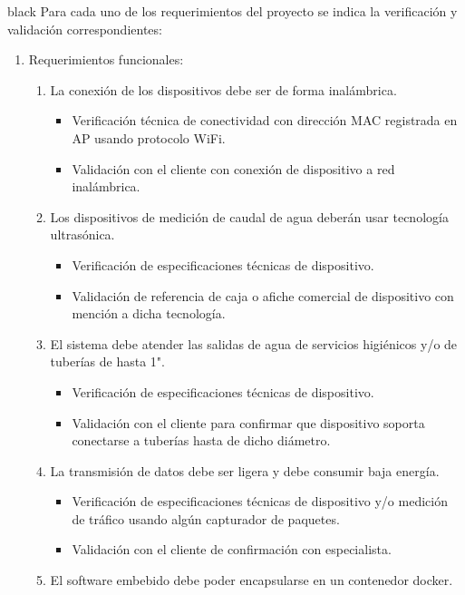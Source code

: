 \documentclass[
11pt, %
codirector, %
]{charter}
\begin{document}
\begin{consigna}{black}
Para cada uno de los requerimientos del proyecto se indica la verificación y validación correspondientes:

\begin{enumerate}
\item Requerimientos funcionales:
	\begin{enumerate}
		\item La conexión de los dispositivos debe ser de forma inalámbrica.
			\begin{itemize}
				\item Verificación técnica de conectividad con dirección MAC registrada en AP usando protocolo WiFi. 
				\item Validación con el cliente con conexión de dispositivo a red inalámbrica.
			\end{itemize}
		\item Los dispositivos de medición de caudal de agua deberán usar tecnología ultrasónica.
			\begin{itemize}
				\item Verificación de especificaciones técnicas de dispositivo. 
				\item Validación de referencia de caja o afiche comercial de dispositivo con mención a dicha tecnología.  
			\end{itemize}
		\item El sistema debe atender las salidas de agua de servicios higiénicos y/o de tuberías de hasta 1".
			\begin{itemize}
				\item Verificación de especificaciones técnicas de dispositivo.  
				\item Validación con el cliente para confirmar que dispositivo soporta conectarse a tuberías hasta de dicho diámetro.
			\end{itemize}
		\item La transmisión de datos debe ser ligera y debe consumir baja energía. 
			\begin{itemize}
				\item Verificación de especificaciones técnicas de dispositivo y/o medición de tráfico usando algún capturador de paquetes. 
				\item Validación con el cliente de confirmación con especialista. 
			\end{itemize}
		\item El software embebido debe poder encapsularse en un contenedor docker.
			\begin{itemize}

\end{itemize}
\end{enumerate}
\end{enumerate}
\end{consigna}
\end{document}
